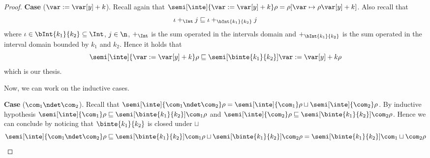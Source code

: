 \begin{proof}
  \medskip

  \noindent
  \textbf{Case} (\(\var := \var[y] + k\)).
  Recall again that
  \({\semi[\inte]{\var := \var[y] + k}\rho} = {\rho[\var \mapsto
    \rho\var[y] + k]}\). Also recall that
  \begin{equation*}
    \iota +_{\Int} j \sqsubseteq \iota +_{\bInt{k_1}{k_2}} j
  \end{equation*}
  where \(\iota \in \bInt{k_1}{k_2} \subseteq \Int\), \(j\in\n\),
  \(+_{\Int}\) is the sum operated in the intervals domain and
  \(+_{\bInt{k_1}{k_2}}\) is the sum operated in the interval domain
  bounded by \(k_1\) and \(k_2\). %
  Hence it holds that
  \begin{equation*}
    {\semi[\inte]{\var := \var[y] + k}\rho} \sqsubseteq {\semi[\binte{k_1}{k_2}]{\var := \var[y] + k}\rho}
  \end{equation*}
  which is our thesis.

  \medskip
  \noindent
  Now, we can work on the inductive cases.

  \medskip

  \noindent
  \textbf{Case} (\(\com_1 \ndet \com_2\)).
  Recall that
  \({\semi[\inte]{\com_1 \ndet \com_2}\rho} =
  {\semi[\inte]{\com_1}\rho} \sqcup {\semi[\inte]{\com_2}\rho}\). By
  inductive hypothesis
  \({\semi[\inte]{\com_1}\rho} \sqsubseteq
  {\semi[\binte{k_1}{k_2}]{\com_1}\rho}\) and
  \({\semi[\inte]{\com_2}\rho} \sqsubseteq
  {\semi[\binte{k_1}{k_2}]{\com_2}\rho}\). Hence we can conclude by noticing
  that \(\binte{k_1}{k_2}\) is closed under \(\sqcup\)
  \begin{equation*}
    \semi[\inte]{\com_1 \ndet \com_2}\rho \sqsubseteq
    \semi[\binte{k_1}{k_2}]{\com_1}\rho \sqcup \semi[\binte{k_1}{k_2}]{\com_2}\rho =
    \semi[\binte{k_1}{k_2}]{\com_1 \sqcup \com_2}\rho
  \end{equation*}

  \medskip


\end{proof}
